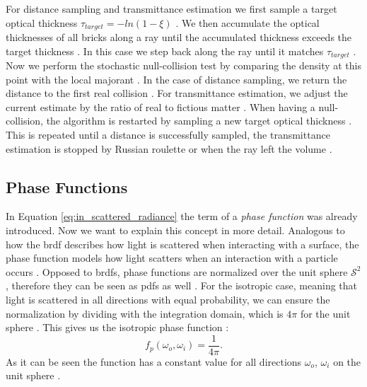 For distance sampling and transmittance estimation we first sample a target optical thickness $\tau_{target}=-ln(1-\xi)$ \cite{brick_grid}.
We then accumulate the optical thicknesses of all bricks along a ray until the accumulated thickness exceeds the target thickness \cite{brick_grid}.
In this case we step back along the ray until it matches $\tau_{target}$ \cite{brick_grid}.
Now we perform the stochastic null-collision test by comparing the density at this point with the local majorant \cite{brick_grid}.
In the case of distance sampling, we return the distance to the first real collision \cite{brick_grid}.
For transmittance estimation, we adjust the current estimate by the ratio of real to fictious matter \cite{brick_grid}.
When having a null-collision, the algorithm is restarted by sampling a new target optical thickness \cite{brick_grid}.
This is repeated until a distance is successfully sampled, the transmittance estimation is stopped by Russian roulette or when the ray left the volume \cite{brick_grid}.

\subsection{Phase Functions}
\label{subsec:phase_function}
In Equation \ref{eq:in_scattered_radiance} the term of a \textit{phase function} was already introduced.
Now we want to explain this concept in more detail.
Analogous to how the \ac{brdf} describes how light is scattered when interacting with a surface, the phase function models how light scatters when an interaction with a particle occurs \cite{novak_overview}.
Opposed to \acsp{brdf}, phase functions are normalized over the unit sphere $\mathcal{S}^2$, therefore they can be seen as \acsp{pdf} as well \cite{pbr}.
For the isotropic case, meaning that light is scattered in all directions with equal probability, we can ensure the normalization by dividing with the integration domain, which is $4\pi$ for the unit sphere \cite{pbr}.
This gives us the isotropic phase function \cite{novak_overview}:
\begin{equation*}
    f_p(\omega_o, \omega_i)=\frac{1}{4\pi}.
\end{equation*}
As it can be seen the function has a constant value for all directions $\omega_o$, $\omega_i$ on the unit sphere \cite{novak_overview}.

